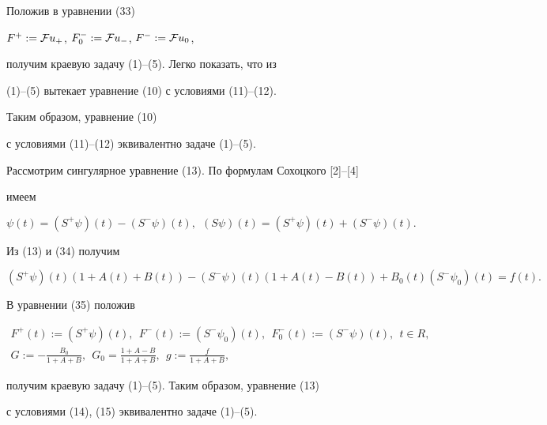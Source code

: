 Положив в уравнении (33) 


$F^+:={\cal F}u_+$, $F^-_0:={\cal F}u_-$, $F^-:={\cal F}u_0$,


получим краевую задачу (1)--(5). Легко показать, что из


(1)--(5) вытекает уравнение (10) с условиями (11)--(12).


Таким образом, уравнение (10)


с условиями (11)--(12) эквивалентно задаче (1)--(5).





Рассмотрим сингулярное уравнение (13). По формулам Сохоцкого [2]--[4]


имеем


\begin{equation}


\psi (t)=(S^+\psi)(t)- (S^-\psi)(t),\ \ (S\psi) (t)=(S^+\psi)(t)+


(S^-\psi)(t).


\end{equation}


Из (13) и (34) получим


\begin{equation}


(S^+\psi)(t)(1+A(t)+B(t))- (S^-\psi)(t)(1+A(t)-B(t))+


B_0(t) (S^-\psi_0)(t)=f(t).


\end{equation}


В уравнении (35) положив


\begin{gather*}


F^+(t):= (S^+\psi)(t),\ \ F^-(t):= (S^-\psi_0)(t),


\ \ F^-_0(t):=(S^-\psi)(t),\ \ t\in R, \\


G:=-\frac{B_0}{1+A+B},\ \ G_0=\frac{1+A-B}{1+A+B},\ \ g:=\frac{f}{1+A+B},


\end{gather*}


получим краевую задачу (1)--(5). Таким образом, уравнение (13)


с условиями (14), (15) эквивалентно задаче (1)--(5).





